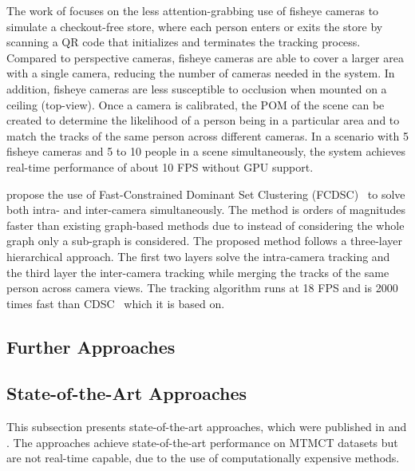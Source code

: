 The work of \textcite{Wang21} focuses on the less attention-grabbing use of fisheye cameras to simulate a checkout-free store, where each person enters or exits the store by scanning a QR code that initializes and terminates the tracking process. Compared to perspective cameras, fisheye cameras are able to cover a larger area with a single camera, reducing the number of cameras needed in the system. In addition, fisheye cameras are less susceptible to occlusion when mounted on a ceiling (top-view). Once a camera is calibrated, the POM of the scene can be created to determine the likelihood of a person being in a particular area and to match the tracks of the same person across different cameras. In a scenario with 5 fisheye cameras and 5 to 10 people in a scene simultaneously, the system achieves real-time performance of about 10 FPS without GPU support.

\citeauthor{Tesfaye19} propose the use of Fast-Constrained Dominant Set Clustering (FCDSC)~\cite{Tesfaye19} to solve both intra- and inter-camera simultaneously. The method is orders of magnitudes faster than existing graph-based methods due to instead of considering the whole graph only a sub-graph is considered. The proposed method follows a three-layer hierarchical approach. The first two layers solve the intra-camera tracking and the third layer the inter-camera tracking while merging the tracks of the same person across camera views. The tracking algorithm runs at 18 FPS and is 2000 times fast than CDSC~\cite{Zemene16} which it is based on.

\subsection{Further Approaches}\label{subsec:further_approaches}




\subsection{State-of-the-Art Approaches}\label{subsec:state-of-the-art_approaches}
This subsection presents state-of-the-art approaches, which were published in \citeyear{Nguyen22a} and \citeyear{Teepe23}. The approaches achieve state-of-the-art performance on MTMCT datasets but are not real-time capable, due to the use of computationally expensive methods.

